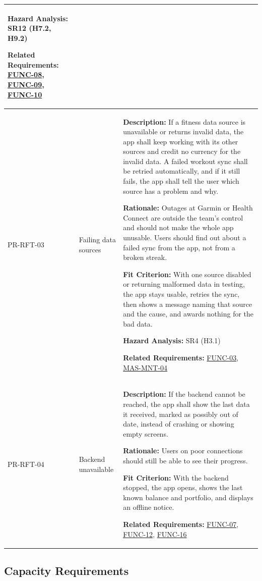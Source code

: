 \documentclass[12pt]{article}
\begin{document}
\begin{xltabular}{\textwidth}{|p{2.6cm}|p{3.4cm}|X|}
\textbf{Hazard Analysis:} SR12 (H7.2, H9.2)

\textbf{Related Requirements:} \hyperlink{req:FUNC-08}{FUNC-08}, \hyperlink{req:FUNC-09}{FUNC-09}, \hyperlink{req:FUNC-10}{FUNC-10}\\
\hline

PR-RFT-03\hypertarget{req:PR-RFT-03}{} &
Failing data sources &
\textbf{Description:} If a fitness data source is unavailable or returns invalid data, the app shall keep working with its other sources and credit no currency for the invalid data. A failed workout sync shall be retried automatically, and if it still fails, the app shall tell the user which source has a problem and why.

\textbf{Rationale:} Outages at Garmin or Health Connect are outside the team's control and should not make the whole app unusable. Users should find out about a failed sync from the app, not from a broken streak.

\textbf{Fit Criterion:} With one source disabled or returning malformed data in testing, the app stays usable, retries the sync, then shows a message naming that source and the cause, and awards nothing for the bad data.

\textbf{Hazard Analysis:} SR4 (H3.1)

\textbf{Related Requirements:} \hyperlink{req:FUNC-03}{FUNC-03}, \hyperlink{req:MAS-MNT-04}{MAS-MNT-04}\\
\hline

PR-RFT-04\hypertarget{req:PR-RFT-04}{} &
Backend unavailable &
\textbf{Description:} If the backend cannot be reached, the app shall show the last data it received, marked as possibly out of date, instead of crashing or showing empty screens.

\textbf{Rationale:} Users on poor connections should still be able to see their progress.

\textbf{Fit Criterion:} With the backend stopped, the app opens, shows the last known balance and portfolio, and displays an offline notice.

\textbf{Related Requirements:} \hyperlink{req:FUNC-07}{FUNC-07}, \hyperlink{req:FUNC-12}{FUNC-12}, \hyperlink{req:FUNC-16}{FUNC-16}\\
\hline

\end{xltabular}

\subsection{Capacity Requirements}
\end{document}
